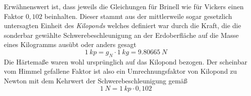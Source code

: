 Erwähnenswert ist, dass jeweils die Gleichungen für Brinell wie für Vickers einen Faktor \(0,102\) beinhalten. Dieser
stammt aus der mittlerweile sogar gesetzlich untersagten Einheit des \textit{Kiloponds} welches definiert war durch
die Kraft, die die sonderbar gewählte Schwerebeschleunigung an der Erdoberfläche auf die Masse eines Kilogramms ausübt
oder anders gesagt
\begin{equation} 
    \SI{1}{kp} = g_N \cdot \SI{1}{kg} = \SI{9,80665}{N}
\end{equation}
Die Härtemaße waren wohl ursprünglich auf das Kilopond bezogen. Der scheinbar vom Himmel gefallene Faktor ist also ein
Umrechnungsfaktor von Kilopond zu Newton mit dem Kehrwert der Schwerebeschleunigung gemäß
\begin{equation}
    \SI{1}{N} = \SI{1}{kp} \cdot 0,102
\end{equation}